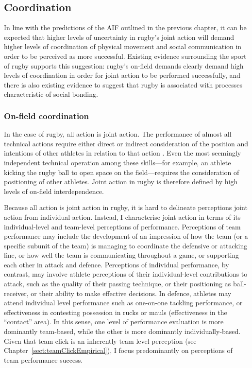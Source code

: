 \begin{CJK}{UTF8}{gbsn}
\subsection{Coordination}
In line with the predictions of the AIF outlined in the previous chapter, it can be expected that higher levels of uncertainty in rugby's joint action will demand higher levels of coordination of physical movement and social communication in order to be perceived as more successful.  Existing evidence surrounding the sport of rugby supports this suggestion: rugby’s on-field demands clearly demand high levels of coordination in order for joint action to be performed successfully, and there is also existing evidence to suggest that rugby is associated with processes characteristic of social bonding.

\subsubsection{On-field coordination}
In the case of rugby, all action is joint action.  The performance of almost all technical actions require either direct or indirect consideration of the position and intentions of other athletes in relation to that action \citep{Downey2012}.  Even the most seemingly independent technical operation among these skills---for example, an athlete kicking the rugby ball to open space on the field---requires the consideration of positioning of other athletes.  Joint action in rugby is therefore defined by high levels of on-field interdependence.

Because all action is joint action in rugby, it is hard to delineate perceptions joint action from individual action.  Instead, I characterise joint action in terms of its individual-level and team-level perceptions of performance. Perceptions of team performance may include the development of an impression of how the team (or a specific subunit of the team) is managing to coordinate the defensive or attacking line, or how well the team is communicating throughout a game, or supporting each other in attack and defence.  Perceptions of individual performance, by contrast, may involve athlete perceptions of their individual-level contributions to attack, such as the quality of their passing technique, or their positioning as ball-receiver, or their ability to make effective decisions.  In defence, athletes may attend individual level performance such as one-on-one tackling performance, or effectiveness in contesting possession in rucks or mauls (effectiveness in the ``contact'' area).  In this sense, one level of performance evaluation is more dominantly team-based, while the other is more dominantly individually-based.  Given that team click is an inherently team-level perception (see Chapter~\ref{sect:teamClickEmpirical}), I focus predominantly on perceptions of team performance success.



\end{CJK}
